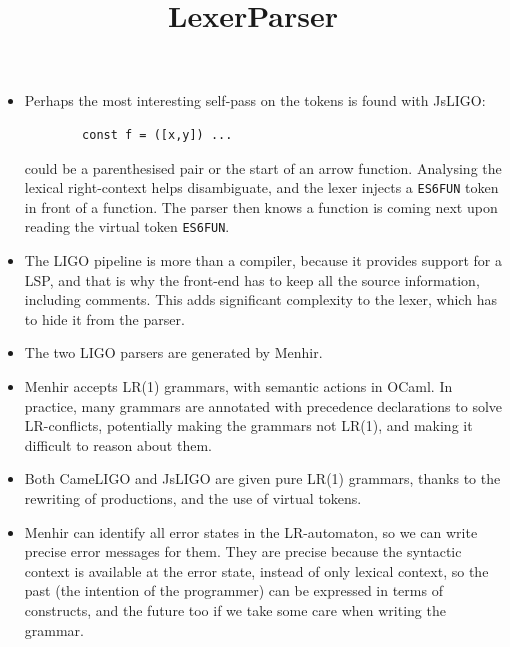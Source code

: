 \documentclass[wide]{slides}
\begin{document}
\begin{slide}
  \lstset{language=JavaScript}

  \title{Lexer}

  \begin{itemize}

    \item Perhaps the most interesting self\hyp{}pass on the tokens is
      found with \textsf{JsLIGO}:
      \begin{lstlisting}
        const f = ([x,y]) ...
      \end{lstlisting}
      could be a parenthesised pair or the start of an arrow
      function. Analysing the lexical right\hyp{}context helps
      disambiguate, and the lexer injects a \texttt{ES6FUN} token in
      front of a function. The parser then knows a function is coming
      next upon reading the virtual token \texttt{ES6FUN}.

    \item The LIGO pipeline is more than a compiler, because it
      provides support for a LSP, and that is why the front-end has to
      keep all the source information, including comments. This adds
      significant complexity to the lexer, which has to hide it from
      the parser.

  \end{itemize}
\end{slide}

\begin{slide}
  \title{Parser}

  \begin{itemize}

    \item The two LIGO parsers are generated by \textsf{Menhir}.

    \item \textsf{Menhir} accepts LR(1) grammars, with semantic
      actions in \textsf{OCaml}. In practice, many grammars are
      annotated with precedence declarations to solve
      LR\hyp{}conflicts, potentially making the grammars not LR(1),
      and making it difficult to reason about them.

    \item Both \textsf{CameLIGO} and \textsf{JsLIGO} are given pure
      LR(1) grammars, thanks to the rewriting of productions, and the
      use of virtual tokens.

    \item \textsf{Menhir} can identify all error states in the
      LR\hyp{}automaton, so we can write precise error messages for
      them. They are precise because the syntactic context is
      available at the error state, instead of only lexical context,
      so the past (the intention of the programmer) can be expressed
      in terms of constructs, and the future too if we take some care
      when writing the grammar.

  \end{itemize}
\end{slide}
\end{document}
